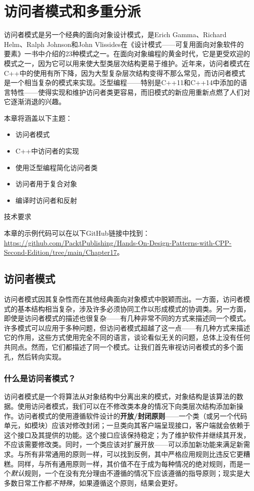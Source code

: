 \chapter{访问者模式和多重分派}

访问者模式是另一个经典的面向对象设计模式，是Erich Gamma、Richard Helm、Ralph Johnson和John Vlissides在《设计模式——可复用面向对象软件的要素》一书中介绍的23种模式之一。在面向对象编程的黄金时代，它是更受欢迎的模式之一，因为它可以用来使大型类层次结构更易于维护。近年来，访问者模式在C++中的使用有所下降，因为大型复杂层次结构变得不那么常见，而访问者模式是一个相当复杂的模式来实现。泛型编程——特别是C++11和C++14中添加的语言特性——使得实现和维护访问者类更容易，而旧模式的新应用重新点燃了人们对它逐渐消退的兴趣。

本章将涵盖以下主题：

\begin{itemize}
\item
  访问者模式
\item
  C++中访问者的实现
\item
  使用泛型编程简化访问者类
\item
  访问者用于复合对象
\item
  编译时访问者和反射
\end{itemize}

技术要求

本章的示例代码可以在以下GitHub链接中找到：\url{https://github.com/PacktPublishing/Hands-On-Design-Patterns-with-CPP-Second-Edition/tree/main/Chapter17}。

\section{访问者模式}

访问者模式因其复杂性而在其他经典面向对象模式中脱颖而出。一方面，访问者模式的基本结构相当复杂，涉及许多必须协同工作以形成模式的协调类。另一方面，即使是访问者模式的描述也很复杂——有几种非常不同的方式来描述同一个模式。许多模式可以应用于多种问题，但访问者模式超越了这一点——有几种方式来描述它的作用，这些方式使用完全不同的语言，谈论看似无关的问题，总体上没有任何共同点。然而，它们都描述了同一个模式。让我们首先审视访问者模式的多个面孔，然后转向实现。

\subsection{什么是访问者模式？}

访问者模式是一个将算法从对象结构中分离出来的模式，对象结构是该算法的数据。使用访问者模式，我们可以在不修改类本身的情况下向类层次结构添加新操作。访问者模式的使用遵循软件设计的\textbf{开放/封闭原则}——一个类（或另一个代码单元，如模块）应该对修改封闭；一旦类向其客户端呈现接口，客户端就会依赖于这个接口及其提供的功能。这个接口应该保持稳定；为了维护软件并继续其开发，不应该需要修改类。同时，一个类应该对扩展开放——可以添加新功能来满足新需求。与所有非常通用的原则一样，可以找到反例，其中严格应用规则比违反它更糟糕。同样，与所有通用原则一样，其价值不在于成为每种情况的绝对规则，而是一个\emph{默认}规则，一个在没有充分理由不遵循的情况下应该遵循的指导原则；现实是大多数日常工作都\emph{不特殊}，如果遵循这个原则，结果会更好。

